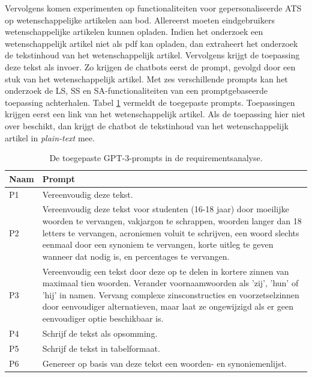 Vervolgens komen experimenten op functionaliteiten voor gepersonaliseerde ATS op wetenschappelijke artikelen aan bod. Allereerst moeten eindgebruikers wetenschappelijke artikelen kunnen opladen. Indien het onderzoek een wetenschappelijk artikel niet als pdf kan opladen, dan extraheert het onderzoek de tekstinhoud van het wetenschappelijk artikel. Vervolgens krijgt de toepassing deze tekst als invoer. Zo krijgen de chatbots eerst de prompt, gevolgd door een stuk van het wetenschappelijk artikel. Met zes verschillende prompts kan het onderzoek de LS, SS en SA-functionaliteiten van een promptgebaseerde toepassing achterhalen. Tabel \ref{table:tested-prompts-requirementsanalysis} vermeldt de toegepaste prompts. Toepassingen krijgen eerst een link van het wetenschappelijk artikel. Als de toepassing hier niet over beschikt, dan krijgt de chatbot de tekstinhoud van het wetenschappelijk artikel in \textit{plain-text} mee. 

\begin{center}
	\begin{table}[H]
		\begin{tabular}{ | m{2cm} | m{14cm} | } 
			\hline
			\textbf{Naam} & \textbf{Prompt} \\
			\hline
			P1 & Vereenvoudig deze tekst. \\
			\hline
			P2 & Vereenvoudig deze tekst voor studenten (16-18 jaar) door moeilijke woorden te vervangen, vakjargon te schrappen, woorden langer dan 18 letters te vervangen, acroniemen voluit te schrijven, een woord slechts eenmaal door een synoniem te vervangen, korte uitleg te geven wanneer dat nodig is, en percentages te vervangen. \\
			\hline
			P3 & Vereenvoudig een tekst door deze op te delen in kortere zinnen van maximaal tien woorden. Verander voornaamwoorden als 'zij', 'hun' of 'hij' in namen. Vervang complexe zinsconstructies en voorzetselzinnen door eenvoudiger alternatieven, maar laat ze ongewijzigd als er geen eenvoudiger optie beschikbaar is. \\
			\hline
			P4 & Schrijf de tekst als opsomming. \\
			\hline
			P5 & Schrijf de tekst in tabelformaat. \\
			\hline
			P6 & Genereer op basis van deze tekst een woorden- en synoniemenlijst. \\
			\hline
		\end{tabular}
		\caption{De toegepaste GPT-3-prompts in de requirementsanalyse.}
		\label{table:tested-prompts-requirementsanalysis}
	\end{table}
\end{center}


